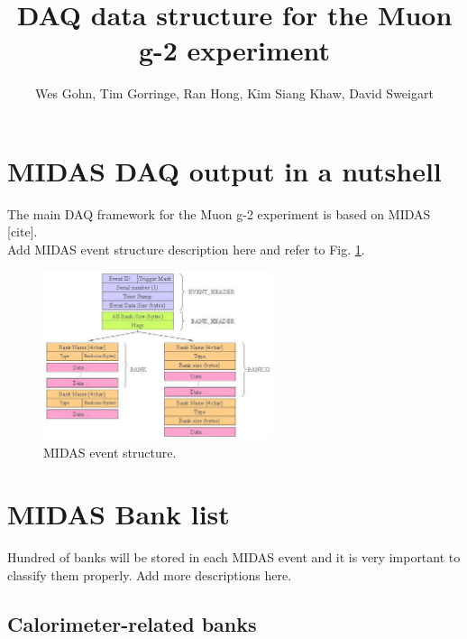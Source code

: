 

\author{Wes Gohn, Tim Gorringe, Ran Hong, Kim Siang Khaw, David Sweigart}
\title{\textbf{DAQ data structure for the Muon g-2 experiment}}


\maketitle


\tableofcontents
\newpage

\section{MIDAS DAQ output in a nutshell}
The main DAQ framework for the Muon g-2 experiment is based on MIDAS [cite]. \\
{\color{red}Add MIDAS event structure description here and refer to Fig. \ref{fig:MIDASEventStructure}.} 

\begin{figure}[htbp]
\centering
\includegraphics[width=0.6\textwidth]{pics/MIDASEventStructure.pdf} 
\caption{MIDAS event structure.}\label{fig:MIDASEventStructure}
\end{figure}


\section{MIDAS Bank list}

Hundred of banks will be stored in each MIDAS event and it is very important to classify them properly.
{\color{red}Add more descriptions here.}

\subsection{Calorimeter-related banks}

